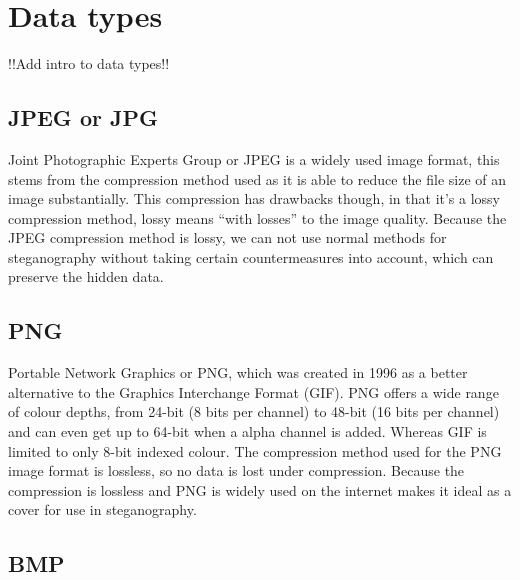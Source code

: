 \section{Data types}
!!Add intro to data types!!

\subsection{JPEG or JPG}
Joint Photographic Experts Group or JPEG is a widely used image format, this stems from the compression method used as it is able to reduce the file size of an image substantially.
This compression has drawbacks though, in that it's a lossy compression method, lossy means ``with losses'' to the image quality.
Because the JPEG compression method is lossy, we can not use normal methods for steganography without taking certain countermeasures into account, which can preserve the hidden data.
\iffalse{TODO: need to specify which countermeasures and rewrite the ending}\fi


\subsection{PNG}
Portable Network Graphics or PNG, which was created in 1996 as a better alternative to the Graphics Interchange Format (GIF).
PNG offers a wide range of colour depths, from 24-bit (8 bits per channel) to 48-bit (16 bits per channel) and can even get up to 64-bit when a alpha channel is added.
Whereas GIF is limited to only 8-bit indexed colour.
The compression method used for the PNG image format is lossless, so no data is lost under compression.
Because the compression is lossless and PNG is widely used on the internet makes it ideal as a cover for use in steganography.


\subsection{BMP}



